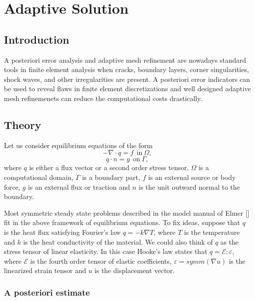 \chapter{Adaptive Solution}

\noindent

\section{Introduction}

A posteriori error analysis and adaptive mesh refinement are nowadays
standard tools in finite element analysis when cracks, boundary layers,
corner singularities, shock waves, and other irregularities are present.
A posteriori error indicators can be used to reveal flaws in finite
element discretizations and well designed adaptive mesh refinemenets
can reduce the computational costs drastically.

\section{Theory}

Let us consider equilibrium equations of the form
\begin{equation}
-\nabla \cdot q = f \ \ \mathrm{in} \ \Omega, \label{equilibrium}
\end{equation}
\begin{equation}
q \cdot n = g \ \ \mathrm{on} \ \Gamma, \label{boundarycondition}
\end{equation}
where $q$ is either a flux vector or a second order stress tensor, $\Omega$
is a computational domain, $\Gamma$ is a boundary part, $f$ is an external
source or body force, $g$ is an external flux or traction and $n$ is the
unit outward normal to the boundary.

Most symmetric steady state problems described in the model manual of
Elmer [] fit in the above framework of equilibrium equations. To fix
ideas, suppose that $q$ is the heat flux satisfying Fourier's law
$q=-k \nabla T$, where $T$ is the temperature and $k$ is the heat
conductivity of the material. We could also think of $q$ as the stress
tensor of linear elasticity. In this case Hooke's law states that 
$q = \mathcal{E} : \varepsilon$, where $\mathcal E$ is the fourth order
tensor of elastic coefficients, $\varepsilon = symm(\nabla u)$ is the 
linearized strain tensor and $u$ is the displacement vector.

\subsection{A posteriori estimate}

